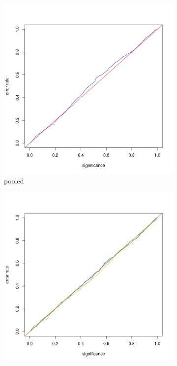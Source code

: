 \documentclass[preprint,12pt,authoryear]{elsarticle}
\begin{document}
\begin{figure}[H]
\begin{center}
  \begin{subfigure}{.3\textwidth}
  \centering
  \includegraphics[scale=0.2]{pooledCalibrationPlot}
  \caption{pooled} \label{fig:pooledCalibrationPlot}
   \end{subfigure}    
  \begin{subfigure}{.3\textwidth}
  \centering
  \includegraphics[scale=0.2]{eqSourceInd}

\end{subfigure}
\end{center}
\end{figure}
\end{document}
